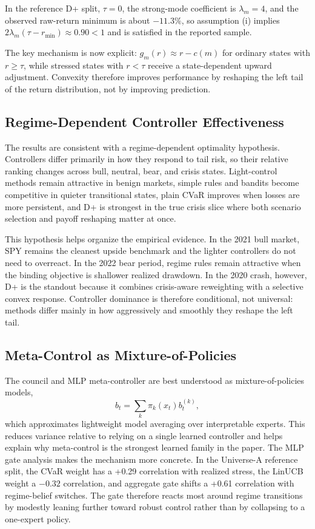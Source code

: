 \documentclass[10pt,twocolumn]{article}
\begin{document}
In the reference D+ split, $\tau=0$, the strong-mode coefficient is $\lambda_m=4$, and the observed raw-return minimum is about $-11.3\%$, so assumption (i) implies $2\lambda_m(\tau-r_{\min})\approx 0.90<1$ and is satisfied in the reported sample.

The key mechanism is now explicit: $g_m(r)\approx r-c(m)$ for ordinary states
with $r\ge\tau$, while stressed states with $r<\tau$ receive a state-dependent
upward adjustment. Convexity therefore improves performance by reshaping the
left tail of the return distribution, not by improving prediction.

\subsection{Regime-Dependent Controller Effectiveness}

The results are consistent with a regime-dependent optimality hypothesis.
Controllers differ primarily in how they respond to tail risk, so their
relative ranking changes across bull, neutral, bear, and crisis states.
Light-control methods remain attractive in benign markets, simple rules and
bandits become competitive in quieter transitional states, plain CVaR improves
when losses are more persistent, and D+ is strongest in the true crisis slice
where both scenario selection and payoff reshaping matter at once.

This hypothesis helps organize the empirical evidence. In the 2021 bull market,
SPY remains the cleanest upside benchmark and the lighter controllers do not
need to overreact. In the 2022 bear period, regime rules remain attractive
when the binding objective is shallower realized drawdown. In the 2020 crash,
however, D+ is the standout because it combines crisis-aware reweighting with a
selective convex response. Controller dominance is therefore conditional, not
universal: methods differ mainly in how aggressively and smoothly they reshape
the left tail.

\subsection{Meta-Control as Mixture-of-Policies}

The council and MLP meta-controller are best understood as
mixture-of-policies models,
\[
b_t = \sum_k \pi_k(x_t) b_t^{(k)},
\]
which approximates lightweight model averaging over interpretable experts. This
reduces variance relative to relying on a single learned controller and helps
explain why meta-control is the strongest learned family in the paper. The MLP
gate analysis makes the mechanism more concrete. In the Universe-A reference
split, the CVaR weight has a +0.29 correlation with realized stress, the
LinUCB weight a $-0.32$ correlation, and aggregate gate shifts a +0.61
correlation with regime-belief switches. The gate therefore reacts most around
regime transitions by modestly leaning further toward robust control rather
than by collapsing to a one-expert policy.
\end{document}
